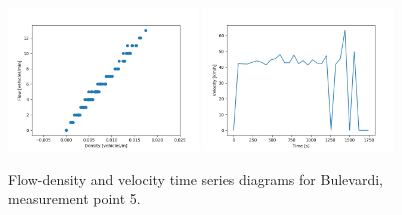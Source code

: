 \documentclass[english, 12pt, a4paper, elec, utf8, pdfa, online]{aaltothesis}
\begin{document}
\begin{figure}[ht!]
    \centering
    \includegraphics[width=0.45\textwidth]{graphs/Bulevardi_5_flw_dns.png}
    \includegraphics[width=0.45\textwidth]{graphs/Bulevardi_5_spd_time_6.png}
    \caption{Flow-density and velocity time series diagrams for Bulevardi, measurement point 5.}
\end{figure}
\end{document}
